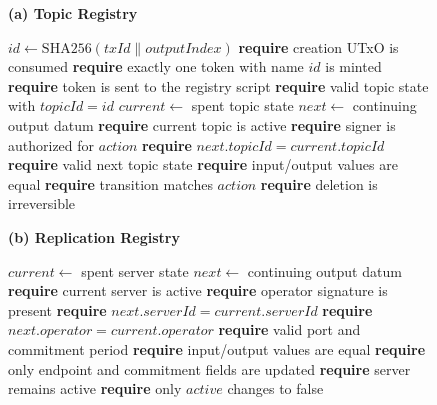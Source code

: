 \begin{figure}[!t]
    \centering
    \footnotesize

    \begin{minipage}[t]{0.49\textwidth}
        \vspace{0pt}
        \textbf{(a) Topic Registry}
        \vspace{2pt}

        \begin{algorithmic}[1]
                \State $id \gets \mathrm{SHA256}(txId \parallel outputIndex)$
                \State \textbf{require} creation UTxO is consumed
                \State \textbf{require} exactly one token with name $id$ is minted
                \State \textbf{require} token is sent to the registry script
                \State \textbf{require} valid topic state with $topicId = id$
            \Else
                \State $current \gets$ spent topic state
                \State $next \gets$ continuing output datum
                \State \textbf{require} current topic is active
                \State \textbf{require} signer is authorized for $action$
                \State \textbf{require} $next.topicId = current.topicId$
                \State \textbf{require} valid next topic state
                \State \textbf{require} input/output values are equal
                \State \textbf{require} transition matches $action$
                \State \textbf{require} deletion is irreversible
            \EndIf
        \end{algorithmic}
    \end{minipage}
    \hfill
    \begin{minipage}[t]{0.49\textwidth}
        \vspace{0pt}
        \textbf{(b) Replication Registry}
        \vspace{2pt}

        \begin{algorithmic}[1]
            \State $current \gets$ spent server state
            \State $next \gets$ continuing output datum
            \State \textbf{require} current server is active
            \State \textbf{require} operator signature is present
            \State \textbf{require} $next.serverId = current.serverId$
            \State \textbf{require} $next.operator = current.operator$
            \State \textbf{require} valid port and commitment period
            \State \textbf{require} input/output values are equal
                \State \textbf{require} only endpoint and
                \Statex \hspace{2.3em} commitment fields are updated
                \State \textbf{require} server remains active
            \State \textbf{require} only $active$ changes to false
            \EndIf
        \end{algorithmic}
    \end{minipage}


\end{figure}
